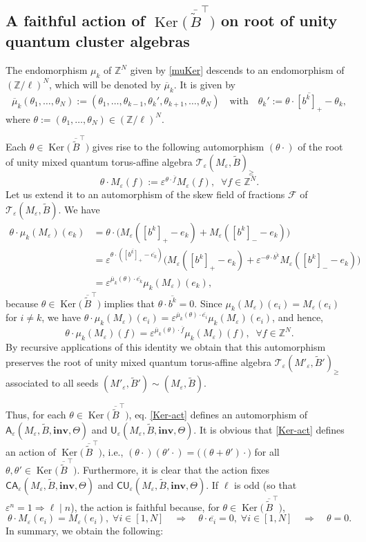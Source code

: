 \documentclass[11pt]{amsart}
\theoremstyle{plain}
\def \Zset {{\mathbb Z}}
\def \A {{\boldsymbol{\mathsf A}}}
\def \C {{\boldsymbol{\mathsf C}}}
\def \U {{\boldsymbol{\mathsf U}}}
\def \B  {{\widetilde{B}}}
\newcommand \inv {{\mathbf{inv}}}
\def \TT {{\mathcal{T}}}
\def \FF {{\mathcal{F}}}
\def \ep {\varepsilon}
\def \ol {\overline}
\DeclareMathOperator \Ker { {\mathrm{Ker}} }
\begin{document}
\subsection{A faithful action of $\Ker \big( \, \ol{\B}^\top \big)$ on root of unity quantum cluster algebras} 
The endomorphism $\mu_k$ of $\Zset^N$ given by \eqref{muKer} descends to an endomorphism of $(\Zset/ \ell)^N$, which will be denoted by $\ol{\mu}_k$. It is given by 
\[
\ol{\mu}_k(\theta_1, \ldots, \theta_N) 
:=(\theta_1, \dots,\theta_{k-1}, \theta_k', \theta_{k+1}, \dots, \theta_N) \quad 
\mbox{with} \quad \theta_k' := \theta \cdot \ol{[b^k]_+} - \theta_k, 
\]
where $\theta := (\theta_1, \ldots, \theta_N) \in (\Zset/ \ell)^N$.


Each $\theta \in  \Ker \big( \, \ol{\B}^\top \big)$ gives rise to the following automorphism $(\theta \cdot)$ of the root of unity mixed quantum torus-affine algebra $\TT_\ep(M_\ep, \B)_\geq$
\begin{equation}
\label{Ker-act}
\theta \cdot M_\ep(f):= \ep^{\theta \cdot \ol{f}} M_\ep(f), \; \; \forall f \in \Zset^N.
\end{equation}
Let us extend it to an automorphism of the skew field of fractions $\FF$ of $\TT_\ep(M_\ep, \B)$. We have
\begin{align*}
\theta \cdot \mu_k(M_\ep)(e_k) & =\theta \cdot \Big( M_\ep([b^k]_+ - e_k) + M_\ep([b^k]_- - e_k)\Big)\\
&= \ep^{\theta \cdot (\ol{[b^k]_+} - \ol{e_k})} \Big( M_\ep([b^k]_+ - e_k) + \ep^{- \theta \cdot \ol{b^k}} M_\ep([b^k]_- - e_k) \Big)\\
&= \ep^{ \ol{\mu}_k(\theta) \cdot \ol{e_k}} \mu_k(M_\ep)(e_k),
\end{align*}
because $\theta \in  \Ker \big( \, \ol{\B}^\top \big)$ implies that 
$\theta \cdot \ol{b^k} =0$. Since $\mu_k(M_\ep)(e_i) = M_\ep(e_i)$ for $i \neq k$, we have 
$\theta \cdot \mu_k(M_\ep)(e_i) = \ep^{ \ol{\mu}_k(\theta) \cdot \ol{e_i}} \mu_k(M_\ep)(e_i)$, and hence, 
\[
\theta \cdot \mu_k(M_\ep)(f)= 
\ep^{ \ol{\mu}_k(\theta) \cdot \ol{f}} \mu_k(M_\ep)(f), 
\; \; \forall f \in \Zset^N.
\]
By recursive applications of this identity we obtain that this automorphism preserves the root of unity mixed quantum torus-affine algebra $\TT_\ep(M'_\ep, \B')_\geq$
associated to all seeds $(M'_\ep, \B') \sim (M_\ep, \B)$. 

Thus, for each $\theta \in \Ker \big( \, \ol{\B}^\top \big)$, eq. \eqref{Ker-act} defines an automorphism of $\A_\ep(M_\ep, \B, \inv, \Theta)$ and 
$\U_\ep(M_\ep, \B, \inv, \Theta)$. It is obvious that \eqref{Ker-act} defines an action of $\Ker \big( \, \ol{\B}^\top \big)$, i.e., $(\theta \cdot) (\theta' \cdot) = \big( (\theta + \theta') \cdot \big)$ for all $\theta, \theta' \in \Ker \big( \, \ol{\B}^\top \big)$. Furthermore, it is clear that the action fixes $\C\A_\ep(M_\ep, \B, \inv, \Theta)$ and $\C\U_\ep(M_\ep, \B, \inv, \Theta)$. If $\ell$ is odd (so that $\ep^n =1 \Rightarrow \ell \mid n$), the action is faithful because, for $\theta \in  \Ker \big( \, \ol{\B}^\top \big)$, 
\[
\theta \cdot M_\ep(e_i)= M_\ep(e_i), \; \forall i \in [1,N] \quad 
\Rightarrow \quad \theta \cdot \ol{e_i}=0, \; \forall i \in [1,N] \quad \Rightarrow \quad \theta = 0. 
\]
In summary, we obtain the following:
\end{document}

